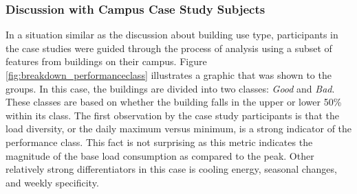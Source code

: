 \subsubsection{Discussion with Campus Case Study Subjects}
\label{sec:performanceclass_oncasestudy}

In a situation similar as the discussion about building use type, participants in the case studies were guided through the process of analysis using a subset of features from buildings on their campus. Figure \ref{fig:breakdown_performanceclass} illustrates a graphic that was shown to the groups. In this case, the buildings are divided into two classes: \emph{Good} and \emph{Bad}. These classes are based on whether the building falls in the upper or lower 50\% within its class. The first observation by the case study participants is that the load diversity, or the daily maximum versus minimum, is a strong indicator of the performance class. This fact is not surprising as this metric indicates the magnitude of the base load consumption as compared to the peak. Other relatively strong differentiators in this case is cooling energy, seasonal changes, and weekly specificity.